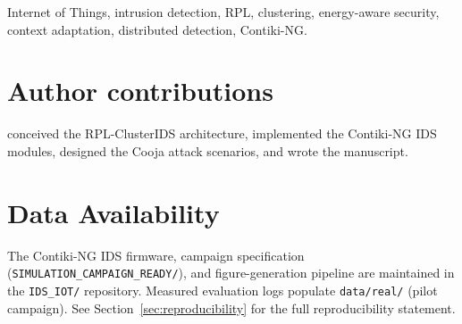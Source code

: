 




\title{\PaperTitleIEEE}


\author{\PaperIEEEJournalAuthor}

\IEEEaftertitletext{%
  \par\vskip 0.6\baselineskip
  \noindent{\footnotesize\PaperIEEEAuthorMark\PaperIEEEAffiliationFootnote\par}%
}

\maketitle

\begin{abstract}

\end{abstract}

\begin{IEEEkeywords}
Internet of Things, intrusion detection, RPL, clustering, energy-aware security, context adaptation, distributed detection, Contiki-NG.
\end{IEEEkeywords}

\FloatBarrier













\section*{Author contributions}
\textbf{\PaperAuthorNameShort{}} conceived the RPL-ClusterIDS architecture, implemented the Contiki-NG IDS modules, designed the Cooja attack scenarios, and wrote the manuscript.

\section{Data Availability}
The Contiki-NG IDS firmware, campaign specification (\texttt{SIMULATION\_CAMPAIGN\_READY/}), and figure-generation pipeline are maintained in the \texttt{IDS\_IOT/} repository.
Measured evaluation logs populate \texttt{data/real/} (pilot campaign).
See Section~\ref{sec:reproducibility} for the full reproducibility statement.





